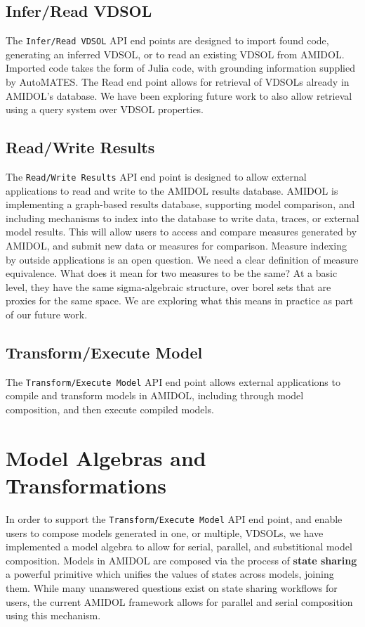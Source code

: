 \documentclass[12pt]{galois-whitepaper}
\begin{document}
\subsection{Infer/Read VDSOL}

The \texttt{Infer/Read VDSOL} API end points are designed to import
found code, generating an inferred VDSOL, or to read an existing VDSOL
from AMIDOL.  Imported code takes the form of Julia code, with
grounding information supplied by AutoMATES.  The Read end point allows
for retrieval of VDSOLs already in AMIDOL's database.  We have been
exploring future work to also allow retrieval using a query system
over VDSOL properties.

\subsection{Read/Write Results}

The \texttt{Read/Write Results} API end point is designed to allow
external applications to read and write to the AMIDOL results
database.  AMIDOL is implementing a graph-based results database,
supporting model comparison, and including mechanisms to index into
the database to write data, traces, or external model results.  This
will allow users to access and compare measures generated by AMIDOL,
and submit new data or measures for comparison.  Measure indexing by
outside applications is an open question.  We need a clear definition
of measure equivalence.  What does it mean for two measures to be the
same?  At a basic level, they have the same sigma-algebraic structure,
over borel sets that are proxies for the same space.  We are exploring
what this means in practice as part of our future work.

\subsection{Transform/Execute Model}

The \texttt{Transform/Execute Model} API end point allows external
applications to compile and transform models in AMIDOL, including
through model composition, and then execute compiled models.

\section{Model Algebras and Transformations}

In order to support the \texttt{Transform/Execute Model} API end
point, and enable users to compose models generated in one, or
multiple, VDSOLs, we have implemented a model algebra to allow for
serial, parallel, and substitional model composition.  Models in
AMIDOL are composed via the process of \textbf{state sharing} a
powerful primitive which unifies the values of states across models,
joining them.  While many unanswered questions exist on state sharing
workflows for users, the current AMIDOL framework allows for parallel
and serial
composition using this mechanism.
\end{document}
